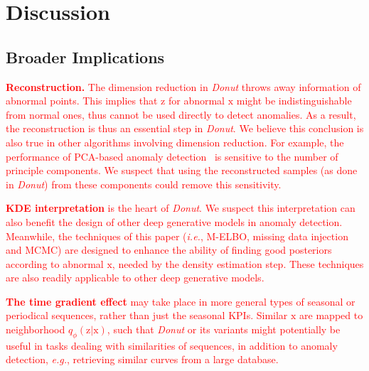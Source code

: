 \documentclass[sigconf]{acmart}
\newif\ifdevelop\developfalse
\newcommand\compactdel[1]{{\textcolor{red}{#1}}}
\newcommand\compactdel[1]{}
\newcommand\compactdel[1]{#1}
\newcommand{\DONUT}{\textit{Donut}}
\newcommand{\IE}{\textit{i.e.}}
\newcommand{\EG}{\textit{e.g.}}
\newcommand{\vv}[1]{\bm{\mathrm{{#1}}}}
\begin{document}

\else
  \ifdevelop
\section{Discussion}
\label{sec:discussion}

\subsection{Broader Implications}
\label{sec:implication}

\compactdel{
\textbf{Reconstruction.} The dimension reduction in \DONUT{} throws away information of abnormal points.
This implies that $\vv{z}$ for abnormal $\vv{x}$ might be indistinguishable from normal ones, thus cannot be used directly to detect anomalies.
As a result, the reconstruction is thus an essential step in \DONUT{}.
We believe this conclusion is also true in other algorithms involving dimension reduction. For example, the performance of  PCA-based anomaly detection~\cite{pca_ad1,pca_ad2,sensitivity_pca} 
is sensitive to the number of principle components. We suspect that using the reconstructed samples (as done in \DONUT{}) from these components could remove this sensitivity.
}

\compactdel{
\textbf{KDE interpretation} is the heart of \DONUT{}.  We suspect this interpretation can also benefit the design of other deep generative models in anomaly detection.  Meanwhile, the techniques of this paper (\IE, M-ELBO, missing data injection and MCMC) are designed to enhance the ability of finding good posteriors according to abnormal $\vv{x}$, needed by the density estimation step.  These techniques are also readily applicable to other deep generative models.
}

\compactdel{
\textbf{The time gradient effect} may take place in more general types of seasonal or periodical sequences, rather than just the seasonal KPIs.
Similar $\vv{x}$ are mapped to neighborhood $q_{\phi}(\vv{z}|\vv{x})$, such that \DONUT{} or its variants might potentially be useful in tasks dealing with similarities of sequences, in addition to anomaly detection, \EG, retrieving similar curves from a large database.
}
\end{document}

